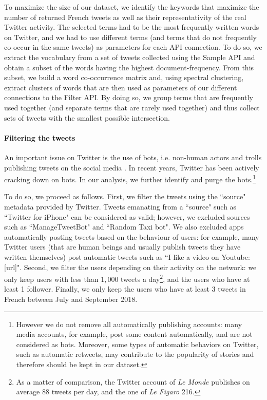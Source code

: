 To maximize the size of our dataset, we identify the keywords that maximize the number of returned French tweets as well as their representativity of the real Twitter activity. The selected terms had to be the most frequently written words on Twitter, and we had to use different terms (and terms that do not frequently co-occur in the same tweets) as parameters for each API connection. To do so, we extract the vocabulary from a set of tweets collected using the Sample API and obtain a subset of the words having the highest document-frequency. From this subset, we build a word co-occurrence matrix and, using spectral clustering, extract  clusters of words that are then used as parameters of our different connections to the Filter API. By doing so, we group terms that are  frequently used together (and separate terms that are rarely used together) and thus collect sets of tweets with the smallest possible intersection.


\paragraph{Filtering the tweets}

An important issue on Twitter is the use of bots, i.e. non-human actors and trolls publishing tweets on the social media  \citep[see e.g.][]{Gorodnichenkoetal2018}. In recent years, Twitter has been actively cracking down on bots. In our analysis, we further identify and purge the bots.\footnote{However we do not remove all automatically publishing accounts: many media accounts, for example, post some content automatically, and are not considered as bots. Moreover, some types of automatic behaviors on Twitter, such as automatic retweets, may contribute to the popularity of stories and therefore should be kept in our dataset.}

To do so, we proceed as follows. First, we filter the tweets using the ``source" metadata provided by Twitter. Tweets emanating from a ``source" such as ``Twitter for iPhone" can be considered as valid; however, we excluded sources such as ``ManageTweetBot" and ``Random Taxi bot". We also excluded apps automatically posting tweets based on the behaviour of users: for example, many Twitter users (that are human beings and usually publish tweets they have written themselves) post automatic tweets such as ``I like a video on Youtube: [url]". Second, we filter the users depending on their activity on the network: we only keep users with less than $1,000$ tweets a day\footnote{As a matter of comparison, the Twitter account of \textit{Le Monde} publishes on average $88$ tweets per day, and the one of \textit{Le Figaro} 216.}, and the users who have at least 1 follower. Finally, we only keep the users who have at least 3 tweets in French between July and September 2018.


